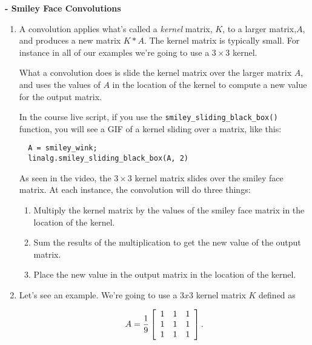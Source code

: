 \documentclass{ximera}
\begin{document}
\begin{problem}
{\bf - Smiley Face Convolutions}

\begin{enumerate}

Now we'll use some common image processing techniques as an opportunity to practice matrix manipulation. We're going to primarily employ what's called a \emph{convolution}.

\item A convolution applies what's called a \emph{kernel} matrix, $K$, to a larger matrix,$A$, and produces a new matrix $K*A$. The kernel matrix is typically small. For instance in all of our examples we're going to use a $3\times 3$ kernel. 

What a convolution does is slide the kernel matrix over the larger matrix $A$, and uses the values of $A$ in the location of the kernel to compute a new value for the output matrix.

In the course live script, if you use the \texttt{smiley\_sliding\_black\_box()} function, you will see a GIF of a kernel sliding over a matrix, like this:

\begin{verbatim}
  A = smiley_wink;
  linalg.smiley_sliding_black_box(A, 2)
\end{verbatim}

\begin{center}
\end{center}

As seen in the video, the $3\times 3$ kernel matrix slides over the smiley face matrix. At each instance, the convolution will do three things:
\begin{enumerate}
\item Multiply the kernel matrix by the values of the smiley face matrix in the location of the kernel.
\item Sum the results of the multiplication to get the new value of the output matrix.
\item Place the new value in the output matrix in the location of the kernel.
\end{enumerate}

\item Let's see an example. We're going to use a $3x3$ kernel matrix $K$ defined as

$$A=\frac{1}{9}\startmat{ccc}
1 & 1 & 1\\
1 & 1 & 1\\
1 & 1 & 1
\stopmat.$$ 


\end{enumerate}
\end{problem}
\end{document}
